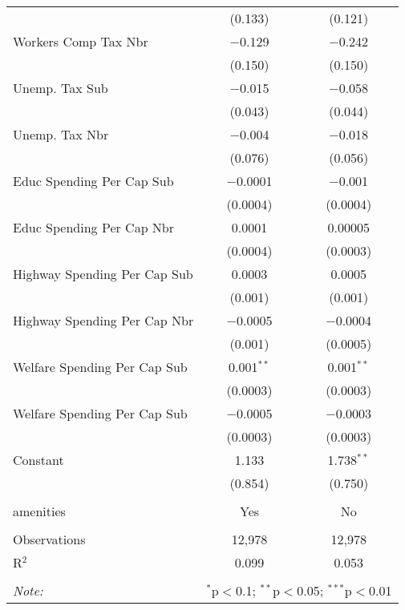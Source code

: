 \begin{table}[!htbp]
\begin{tabular}{@{\extracolsep{5pt}}lcc}
  & (0.133) & (0.121) \\ 
  Workers Comp Tax Nbr & $-$0.129 & $-$0.242 \\ 
  & (0.150) & (0.150) \\ 
  Unemp. Tax Sub & $-$0.015 & $-$0.058 \\ 
  & (0.043) & (0.044) \\ 
  Unemp. Tax Nbr & $-$0.004 & $-$0.018 \\ 
  & (0.076) & (0.056) \\ 
  Educ Spending Per Cap Sub & $-$0.0001 & $-$0.001 \\ 
  & (0.0004) & (0.0004) \\ 
  Educ Spending Per Cap Nbr & 0.0001 & 0.00005 \\ 
  & (0.0004) & (0.0003) \\ 
  Highway Spending Per Cap Sub & 0.0003 & 0.0005 \\ 
  & (0.001) & (0.001) \\ 
  Highway Spending Per Cap Nbr & $-$0.0005 & $-$0.0004 \\ 
  & (0.001) & (0.0005) \\ 
  Welfare Spending Per Cap Sub & 0.001$^{**}$ & 0.001$^{**}$ \\ 
  & (0.0003) & (0.0003) \\ 
  Welfare Spending Per Cap Sub & $-$0.0005 & $-$0.0003 \\ 
  & (0.0003) & (0.0003) \\ 
  Constant & 1.133 & 1.738$^{**}$ \\ 
  & (0.854) & (0.750) \\ 
 \hline \\[-1.8ex] 
amenities & Yes & No \\ 
\hline \\[-1.8ex] 
Observations & 12,978 & 12,978 \\ 
R$^{2}$ & 0.099 & 0.053 \\ 
\hline 
\hline \\[-1.8ex] 
\textit{Note:}  & \multicolumn{2}{r}{$^{*}$p$<$0.1; $^{**}$p$<$0.05; $^{***}$p$<$0.01} \\ 
\end{tabular} 
\end{table} 
